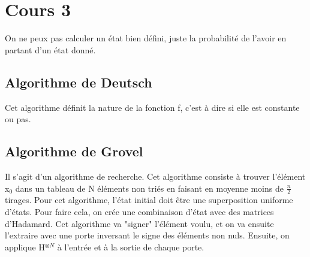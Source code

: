 \section{Cours 3}
On ne peux pas calculer un état bien défini, juste la probabilité de l'avoir en partant d'un état donné.

\subsection{Algorithme de Deutsch}
Cet algorithme définit la nature de la fonction f, c'est à dire si elle est constante ou pas.

\subsection{Algorithme de Grovel}
Il s'agit d'un algorithme de recherche. Cet algorithme consiste à trouver l'élément x$_0$ dans un tableau de N éléments
non triés en faisant en moyenne moins de $\frac{n}{2}$ tirages. Pour cet algorithme, l'état initial doit être une
superposition uniforme d'états. Pour faire cela, on crée une combinaison d'état avec des matrices d'Hadamard. Cet
algorithme va "signer" l'élément voulu, et on va ensuite l'extraire avec une porte inversant le signe des éléments non
nuls. Ensuite, on applique H$^{\otimes N}$ à l'entrée et à la sortie de chaque porte.
